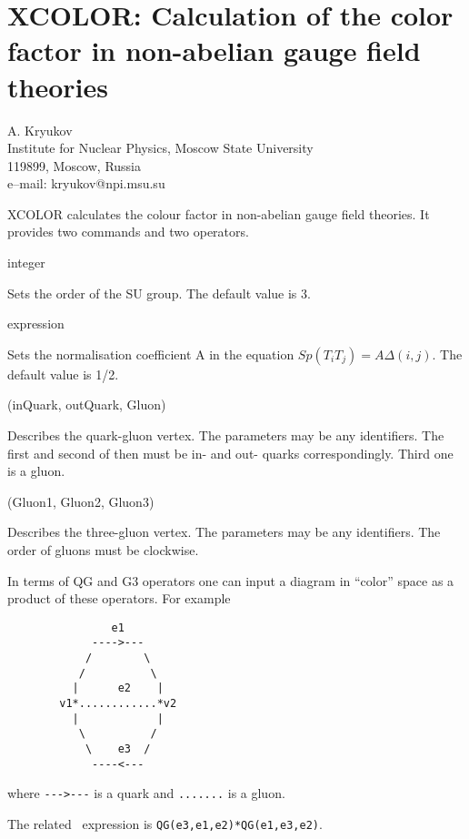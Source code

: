 \chapter[XCOLOR: Color factor in gauge theory]%
        {XCOLOR: Calculation of the color factor in non-abelian gauge
field theories}
\label{XCOLOR}

{\footnotesize
\begin{center}
A. Kryukov \\
Institute for Nuclear Physics, Moscow State University \\
119899, Moscow, Russia \\[0.05in]
e--mail: kryukov@npi.msu.su
\end{center}
}

XCOLOR calculates the colour factor in non-abelian gauge field
theories.  It provides two commands and two operators.

 integer

Sets the order of the SU group.  The default value is 3.

 expression

Sets the normalisation coefficient A in the equation
$Sp(T_i T_j) = A \Delta(i,j)$.  The default value is 1/2.

(inQuark, outQuark, Gluon)

Describes the quark-gluon vertex.  The parameters may be any identifiers.
The first and second of then must be in- and out- quarks correspondingly.
Third one is a gluon.

(Gluon1, Gluon2, Gluon3)

Describes the three-gluon vertex.  The parameters may be any identifiers.
The order of gluons must be clockwise.

In terms of QG and G3 operators one can input a diagram in ``color'' space as
a product of these operators.  For example
\newpage
\begin{verbatim}
                e1
             ---->---
            /        \
           /          \
          |      e2    |
        v1*............*v2
          |            |
           \          /
            \    e3  /
             ----<---
\end{verbatim}
where \verb+--->---+ is a quark and \verb+.......+ is a gluon.

The related \REDUCE\ expression is {\tt QG(e3,e1,e2)*QG(e1,e3,e2)}.

